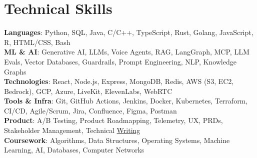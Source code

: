 \documentclass[letterpaper,11pt]{article}
\begin{document}
\section{Technical Skills}
 \begin{itemize}[leftmargin=0.15in, label={}]
    \small{\item{
     \textbf{Languages}{: Python, SQL, Java, C/C++, TypeScript, Rust, Golang, JavaScript, R, HTML/CSS, Bash} \\
     \textbf{ML \& AI}{: Generative AI, LLMs, Voice Agents, RAG, LangGraph, MCP, LLM Evals, Vector Databases, Guardrails, Prompt Engineering, NLP, Knowledge Graphs} \\
     \textbf{Technologies}{: React, Node.js, Express, MongoDB, Redis, AWS (S3, EC2, Bedrock), GCP, Azure, LiveKit, ElevenLabs, WebRTC} \\
     \textbf{Tools \& Infra}{: Git, GitHub Actions, Jenkins, Docker, Kubernetes, Terraform, CI/CD, Agile/Scrum, Jira, Confluence, Figma, Postman} \\
     \textbf{Product}{: A/B Testing, Product Roadmapping, Telemetry, UX, PRDs, Stakeholder Management, Technical \href{https://virkhanna.substack.com/}{\textcolor{linkblue}{Writing}}} \\
     \textbf{Coursework}{: Algorithms, Data Structures, Operating Systems, Machine Learning, AI, Databases, Computer Networks}
    }}
 \end{itemize}
\vspace{-10pt}
\end{document}
